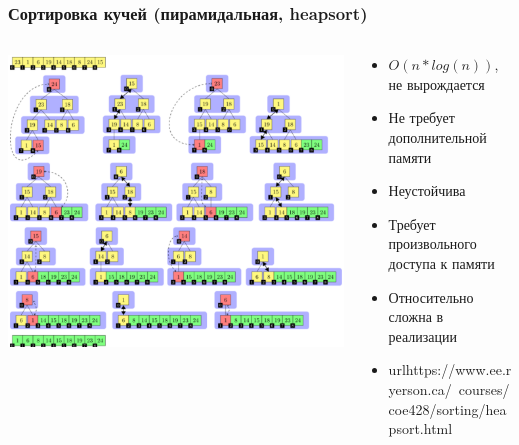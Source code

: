 \documentclass[xetex,mathserif,serif]{beamer}
\begin{document}
	\begin{frame}
		\frametitle{Сортировка кучей (пирамидальная, heapsort)}
		\begin{columns}
			\begin{column}{0.5\textwidth}
				\includegraphics[width=\textwidth]{heapsort.png}
			\end{column}
			\begin{column}{0.5\textwidth}
				\begin{itemize}
					\item $O(n * log(n))$, не вырождается
					\item Не требует дополнительной памяти
					\item Неустойчива
					\item Требует произвольного доступа к памяти
					\item Относительно сложна в реализации
					\item url{https://www.ee.ryerson.ca/~courses/coe428/sorting/heapsort.html}
				\end{itemize}
			\end{column}
		\end{columns}
	\end{frame}
\end{document}
